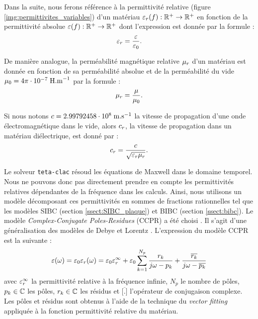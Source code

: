 Dans la suite, nous ferons référence à la permittivité relative
(figure \ref{img:permittivites_variables}) d'un matériau
$\varepsilon_r(f):\mathbb{R}^{+}\rightarrow\mathbb{R}^{+}$ en fonction de
la permittivité absolue $\varepsilon(f):\mathbb{R}^{+}\rightarrow\mathbb{R}^{+}$
dont l'expression est donnée par la formule :
\begin{align}
\varepsilon_r = \frac{\varepsilon}{\varepsilon_0} .
\end{align}

\begin{remark}
	De manière analogue, la perméabilité magnétique relative $\mu_r$ d'un
	matériau est donnée en fonction de sa perméabilité absolue et de la perméabilité
	du vide
	$\mu_0 = 4 \pi \cdot 10^{-7} \; \mathrm{H.m}^{-1}$ par la formule :
	\begin{align}
	\mu_r = \frac{\mu}{\mu_0} .
	\end{align}
\end{remark}

\begin{remark}
	Si nous notons $c = 2.99792458 \cdot 10^{8} \; \mathrm{m.s}^{-1}$
	la vitesse de propagation d'une onde électromagnétique dans le vide, alors $c_r$,
	la vitesse de propagation dans un matériau diélectrique, est donné par :
	\begin{align}
	c_r = \frac{c}{\sqrt{\varepsilon_r \mu_r}} .
	\end{align}
\end{remark}

Le solveur \texttt{teta-clac} résoud les équations de Maxwell dans le domaine temporel.
Nous ne pouvons donc pas directement prendre en compte les permittivités
relatives dépendantes de la fréquence dans les calculs.
Ainsi, nous utilisons un modèle décomposant ces permittivités
en sommes de fractions rationnelles tel que les modèles SIBC
(section \ref{ssect:SIBC_plaque}) et BIBC (section \ref{ssect:bibc}).
Le modèle
\textit{Complex-Conjugate Poles-Residues} (CCPR) a été choisi \cite{ccpr_han,
ccpr_ramadan}. Il s'agit d'une généralisation des modèles de Debye
et Lorentz \cite{taflove2005computational}. L'expression du modèle CCPR est la suivante :
\begin{align}
\varepsilon(\omega) = \varepsilon_0 \varepsilon_r(\omega) =
\varepsilon_0 \varepsilon_r^\infty + \varepsilon_0
\sum_{k = 1}^{N_p} \frac{r_k}{j \omega - p_k} +
\frac{\overline{r_k}}{j \omega - \overline{p_k}}
\label{eq:ccpr_epsilon}
\end{align}
avec $\varepsilon_r^\infty$ la permittivité
relative à la fréquence infinie, $N_p$ le nombre de pôles, $p_k \in \mathbb{C}$
les pôles, $r_k \in \mathbb{C}$ les résidus et $\overline{\lbrack.\rbrack}$ l'opérateur de
conjugaison complexe. Les pôles et résidus sont obtenus à l'aide de la technique du
\textit{vector fitting} \cite{772353} appliquée à la fonction
permittivité relative du matériau.


